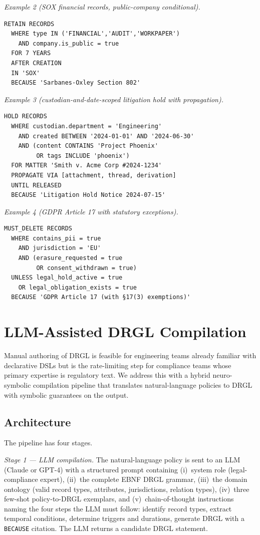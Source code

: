 \documentclass{ieeeaccess}
\begin{document}
\textit{Example 2 (SOX financial records, public-company conditional).}
\begin{lstlisting}[language=drgl,basicstyle=\ttfamily\footnotesize]
RETAIN RECORDS
  WHERE type IN ('FINANCIAL','AUDIT','WORKPAPER')
    AND company.is_public = true
  FOR 7 YEARS
  AFTER CREATION
  IN 'SOX'
  BECAUSE 'Sarbanes-Oxley Section 802'
\end{lstlisting}

\textit{Example 3 (custodian-and-date-scoped litigation hold with propagation).}
\begin{lstlisting}[language=drgl,basicstyle=\ttfamily\footnotesize]
HOLD RECORDS
  WHERE custodian.department = 'Engineering'
    AND created BETWEEN '2024-01-01' AND '2024-06-30'
    AND (content CONTAINS 'Project Phoenix'
         OR tags INCLUDE 'phoenix')
  FOR MATTER 'Smith v. Acme Corp #2024-1234'
  PROPAGATE VIA [attachment, thread, derivation]
  UNTIL RELEASED
  BECAUSE 'Litigation Hold Notice 2024-07-15'
\end{lstlisting}

\textit{Example 4 (GDPR Article 17 with statutory exceptions).}
\begin{lstlisting}[language=drgl,basicstyle=\ttfamily\footnotesize]
MUST_DELETE RECORDS
  WHERE contains_pii = true
    AND jurisdiction = 'EU'
    AND (erasure_requested = true
         OR consent_withdrawn = true)
  UNLESS legal_hold_active = true
    OR legal_obligation_exists = true
  BECAUSE 'GDPR Article 17 (with §17(3) exemptions)'
\end{lstlisting}

\section{LLM-Assisted DRGL Compilation}
\label{sec:llmcomp}

Manual authoring of DRGL is feasible for engineering teams already familiar with declarative DSLs but is the rate-limiting step for compliance teams whose primary expertise is regulatory text. We address this with a hybrid neuro-symbolic compilation pipeline that translates natural-language policies to DRGL with symbolic guarantees on the output.

\subsection{Architecture}

The pipeline has four stages.

\textit{Stage 1 — LLM compilation.} The natural-language policy is sent to an LLM (Claude or GPT-4) with a structured prompt containing (i)~system role (legal-compliance expert), (ii)~the complete EBNF DRGL grammar, (iii)~the domain ontology (valid record types, attributes, jurisdictions, relation types), (iv)~three few-shot policy-to-DRGL exemplars, and (v)~chain-of-thought instructions naming the four steps the LLM must follow: identify record types, extract temporal conditions, determine triggers and durations, generate DRGL with a \texttt{BECAUSE} citation. The LLM returns a candidate DRGL statement.
\end{document}
